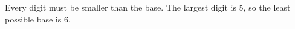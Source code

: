 Every digit must be smaller than the base. The largest digit is 5, so the least possible base is $\boxed6$.
